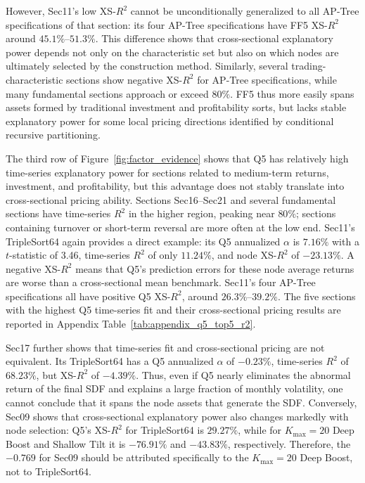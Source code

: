 \documentclass[12pt]{article}
\begin{document}
However, Sec11's low XS-\(R^2\) cannot be unconditionally generalized to all AP-Tree specifications of that section: its four AP-Tree specifications have FF5 XS-\(R^2\) around \(45.1\%\)–\(51.3\%\). This difference shows that cross-sectional explanatory power depends not only on the characteristic set but also on which nodes are ultimately selected by the construction method. Similarly, several trading-characteristic sections show negative XS-\(R^2\) for AP-Tree specifications, while many fundamental sections approach or exceed \(80\%\). FF5 thus more easily spans assets formed by traditional investment and profitability sorts, but lacks stable explanatory power for some local pricing directions identified by conditional recursive partitioning.

The third row of Figure~\ref{fig:factor_evidence} shows that Q5 has relatively high time-series explanatory power for sections related to medium-term returns, investment, and profitability, but this advantage does not stably translate into cross-sectional pricing ability. Sections Sec16–Sec21 and several fundamental sections have time-series \(R^2\) in the higher region, peaking near \(80\%\); sections containing turnover or short-term reversal are more often at the low end. Sec11's TripleSort64 again provides a direct example: its Q5 annualized \(\alpha\) is \(7.16\%\) with a \(t\)-statistic of 3.46, time-series \(R^2\) of only \(11.24\%\), and node XS-\(R^2\) of \(-23.13\%\). A negative XS-\(R^2\) means that Q5's prediction errors for these node average returns are worse than a cross-sectional mean benchmark. Sec11's four AP-Tree specifications all have positive Q5 XS-\(R^2\), around \(26.3\%\)–\(39.2\%\). The five sections with the highest Q5 time-series fit and their cross-sectional pricing results are reported in Appendix Table~\ref{tab:appendix_q5_top5_r2}.

Sec17 further shows that time-series fit and cross-sectional pricing are not equivalent. Its TripleSort64 has a Q5 annualized \(\alpha\) of \(-0.23\%\), time-series \(R^2\) of \(68.23\%\), but XS-\(R^2\) of \(-4.39\%\). Thus, even if Q5 nearly eliminates the abnormal return of the final SDF and explains a large fraction of monthly volatility, one cannot conclude that it spans the node assets that generate the SDF. Conversely, Sec09 shows that cross-sectional explanatory power also changes markedly with node selection: Q5's XS-\(R^2\) for TripleSort64 is \(29.27\%\), while for \(K_{\max}=20\) Deep Boost and Shallow Tilt it is \(-76.91\%\) and \(-43.83\%\), respectively. Therefore, the \(-0.769\) for Sec09 should be attributed specifically to the \(K_{\max}=20\) Deep Boost, not to TripleSort64.
\end{document}
